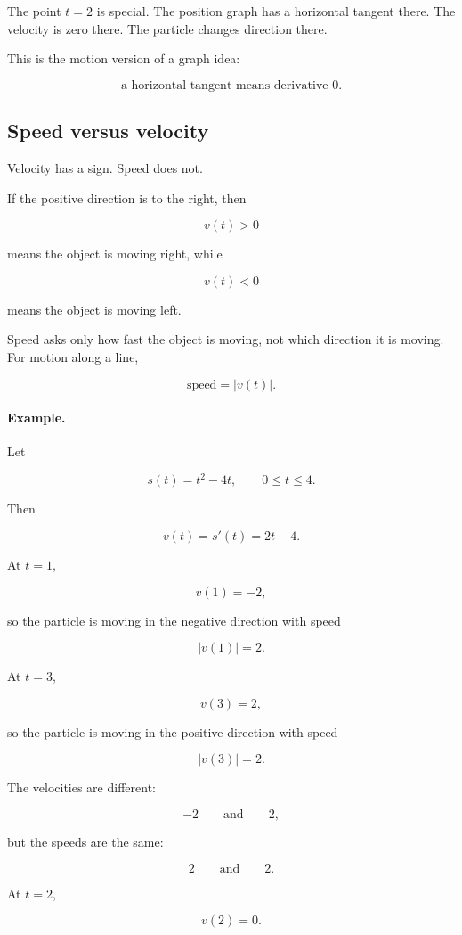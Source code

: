 The point \(t=2\) is special.  The position graph has a horizontal tangent there.  The velocity is zero there.  The particle changes direction there.

This is the motion version of a graph idea:

\[
\text{a horizontal tangent means derivative }0.
\]

\subsection{Speed versus velocity}
\label{subsec:speed-versus-velocity}

Velocity has a sign.  Speed does not.

If the positive direction is to the right, then

\[
v(t)>0
\]

means the object is moving right, while

\[
v(t)<0
\]

means the object is moving left.

Speed asks only how fast the object is moving, not which direction it is moving.  For motion along a line,

\[
\boxed{\text{speed}=|v(t)|.}
\]

\paragraph{Example.}
Let

\[
s(t)=t^2-4t,
\qquad 0\le t\le4.
\]

Then

\[
v(t)=s'(t)=2t-4.
\]

At \(t=1\),

\[
v(1)=-2,
\]

so the particle is moving in the negative direction with speed

\[
|v(1)|=2.
\]

At \(t=3\),

\[
v(3)=2,
\]

so the particle is moving in the positive direction with speed

\[
|v(3)|=2.
\]

The velocities are different:

\[
-2
\qquad\text{and}\qquad
2,
\]

but the speeds are the same:

\[
2
\qquad\text{and}\qquad
2.
\]

At \(t=2\),

\[
v(2)=0.
\]

